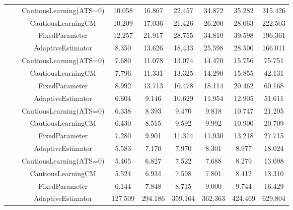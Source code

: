 \begin{table}[!h]
\begin{tabular}[t]{ccccccccc}
 &  & CautiousLearning(ATS=0) & 10.058 & 16.867 & 22.457 & 34.872 & 35.282 & 315.426\\

 &  & CautiousLearningCM & 10.209 & 17.036 & 21.426 & 26.200 & 28.063 & 222.503\\

 & \multirow[t]{-4}{*}{\centering\arraybackslash 0.75} & FixedParameter & 12.257 & 21.917 & 28.755 & 34.810 & 39.598 & 196.361\\
\cmidrule{2-9}
 &  & AdaptiveEstimator & 8.350 & 13.626 & 18.433 & 25.598 & 28.500 & 166.011\\

 &  & CautiousLearning(ATS=0) & 7.680 & 11.078 & 13.074 & 14.470 & 15.756 & 75.751\\

 &  & CautiousLearningCM & 7.796 & 11.331 & 13.325 & 14.290 & 15.855 & 42.131\\

 & \multirow[t]{-4}{*}{\centering\arraybackslash 1.00} & FixedParameter & 8.992 & 13.713 & 16.478 & 18.114 & 20.462 & 60.168\\
\cmidrule{2-9}
 &  & AdaptiveEstimator & 6.604 & 9.146 & 10.629 & 11.954 & 12.905 & 51.611\\

 &  & CautiousLearning(ATS=0) & 6.338 & 8.393 & 9.470 & 9.818 & 10.747 & 21.295\\

 &  & CautiousLearningCM & 6.430 & 8.515 & 9.592 & 9.992 & 10.900 & 20.709\\

 & \multirow[t]{-4}{*}{\centering\arraybackslash 1.25} & FixedParameter & 7.280 & 9.901 & 11.314 & 11.930 & 13.218 & 27.715\\
\cmidrule{2-9}
 &  & AdaptiveEstimator & 5.583 & 7.170 & 7.970 & 8.301 & 8.977 & 18.024\\

 &  & CautiousLearning(ATS=0) & 5.465 & 6.827 & 7.522 & 7.688 & 8.279 & 13.098\\

 &  & CautiousLearningCM & 5.524 & 6.934 & 7.598 & 7.801 & 8.412 & 13.310\\

\multirow[t]{-28}{*}{\centering\arraybackslash 1} & \multirow[t]{-4}{*}{\centering\arraybackslash 1.50} & FixedParameter & 6.144 & 7.848 & 8.715 & 9.000 & 9.744 & 16.429\\
\cmidrule{1-9}
 &  & AdaptiveEstimator & 127.509 & 294.186 & 359.164 & 362.363 & 424.469 & 629.804\\


\end{tabular}
\end{table}
